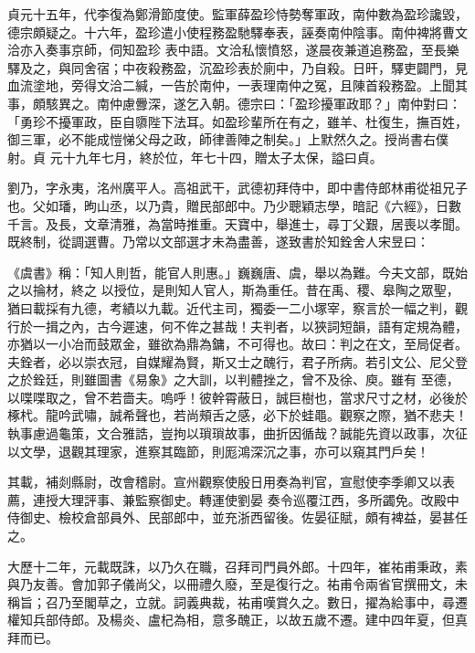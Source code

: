\begin{pinyinscope}
 貞元十五年，代李復為鄭滑節度使。監軍薛盈珍恃勢奪軍政，南仲數為盈珍讒毀，德宗頗疑之。十六年，盈珍遣小使程務盈馳驛奉表，誣奏南仲陰事。南仲裨將曹文洽亦入奏事京師，伺知盈珍
 表中語。文洽私懷憤怒，遂晨夜兼道追務盈，至長樂驛及之，與同舍宿；中夜殺務盈，沉盈珍表於廁中，乃自殺。日旰，驛吏闢門，見血流塗地，旁得文洽二緘，一告於南仲，一表理南仲之冤，且陳首殺務盈。上聞其事，頗駭異之。南仲慮釁深，遂乞入朝。德宗曰：「盈珍擾軍政耶？」南仲對曰：「勇珍不擾軍政，臣自隳陛下法耳。如盈珍輩所在有之，雖羊、杜復生，撫百姓，御三軍，必不能成愷悌父母之政，師律善陣之制矣。」上默然久之。授尚書右僕射。貞
 元十九年七月，終於位，年七十四，贈太子太保，謚曰貞。



 劉乃，字永夷，洺州廣平人。高祖武干，武德初拜侍中，即中書侍郎林甫從祖兄子也。父如璠，昫山丞，以乃貴，贈民部郎中。乃少聰穎志學，暗記《六經》，日數千言。及長，文章清雅，為當時推重。天寶中，舉進士，尋丁父艱，居喪以孝聞。既終制，從調選曹。乃常以文部選才未為盡善，遂致書於知銓舍人宋昱曰：



 《虞書》稱：「知人則哲，能官人則惠。」巍巍唐、虞，舉以為難。今夫文部，既始之以掄材，終之
 以授位，是則知人官人，斯為重任。昔在禹、稷、皋陶之眾聖，猶曰載採有九德，考績以九載。近代主司，獨委一二小塚宰，察言於一幅之判，觀行於一揖之內，古今遲速，何不侔之甚哉！夫判者，以狹詞短韻，語有定規為體，亦猶以一小冶而鼓眾金，雖欲為鼎為鏞，不可得也。故曰：判之在文，至局促者。夫銓者，必以崇衣冠，自媒耀為賢，斯又士之醜行，君子所病。若引文公、尼父登之於銓廷，則雖圖書《易象》之大訓，以判體挫之，曾不及徐、庾。雖有
 至德，以喋喋取之，曾不若嗇夫。嗚呼！彼幹霄蔽日，誠巨樹也，當求尺寸之材，必後於椓杙。龍吟武嘯，誠希聲也，若尚頰舌之感，必下於蛙黽。觀察之際，猶不悲夫！執事慮過龜策，文合雅誥，豈拘以瑣瑣故事，曲折因循哉？誠能先資以政事，次征以文學，退觀其理家，進察其臨節，則厖鴻深沉之事，亦可以窺其門戶矣！



 其載，補剡縣尉，改會稽尉。宣州觀察使殷日用奏為判官，宣慰使李季卿又以表薦，連授大理評事、兼監察御史。轉運使劉晏
 奏令巡覆江西，多所蠲免。改殿中侍御史、檢校倉部員外、民部郎中，並充浙西留後。佐晏征賦，頗有裨益，晏甚任之。



 大歷十二年，元載既誅，以乃久在職，召拜司門員外郎。十四年，崔祐甫秉政，素與乃友善。會加郭子儀尚父，以冊禮久廢，至是復行之。祐甫令兩省官撰冊文，未稱旨；召乃至閣草之，立就。詞義典裁，祐甫嘆賞久之。數日，擢為給事中，尋遷權知兵部侍郎。及楊炎、盧杞為相，意多醜正，以故五歲不遷。建中四年夏，但真拜而已。




\end{pinyinscope}
